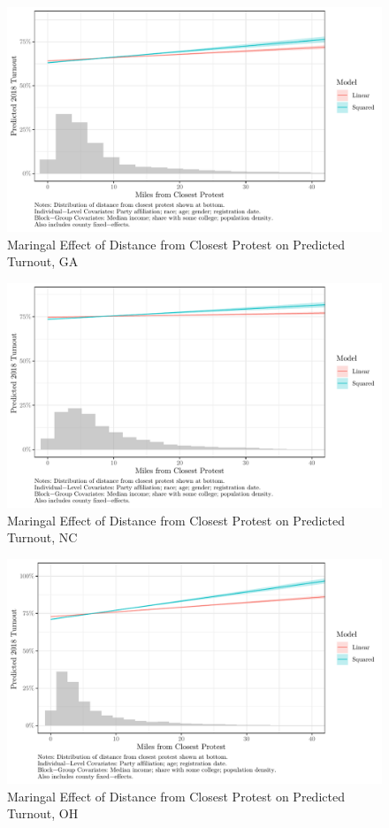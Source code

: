 \documentclass[
  12pt,
]{article}
\begin{document}
\begin{figure}[H]

{\centering \includegraphics{asa_abstract_files/figure-latex/ga-plot-1} 

}

\caption{\label{fig:ga}Maringal Effect of Distance from Closest Protest on Predicted Turnout, GA}\label{fig:ga-plot}
\end{figure}

\begin{figure}[H]

{\centering \includegraphics{asa_abstract_files/figure-latex/nc-plot-1} 

}

\caption{\label{fig:ga}Maringal Effect of Distance from Closest Protest on Predicted Turnout, NC}\label{fig:nc-plot}
\end{figure}

\begin{figure}[H]

{\centering \includegraphics{asa_abstract_files/figure-latex/oh-plot-1} 

}

\caption{\label{fig:ga}Maringal Effect of Distance from Closest Protest on Predicted Turnout, OH}\label{fig:oh-plot}
\end{figure}
\end{document}
